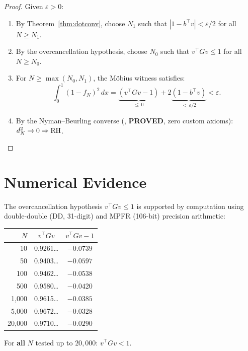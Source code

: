 \documentclass[11pt,a4paper]{article}
\begin{document}
\begin{proof}
Given $\varepsilon > 0$:
\begin{enumerate}
  \item By Theorem~\ref{thm:dotconv}, choose $N_1$ such that
    $|1 - b^\top v| < \varepsilon/2$ for all $N \geq N_1$.
  \item By the overcancellation hypothesis, choose $N_0$ such that
    $v^\top G v \leq 1$ for all $N \geq N_0$.
  \item For $N \geq \max(N_0, N_1)$, the M\"obius witness satisfies:
    \[
      \int_0^1 (1 - f_N)^2\,dx
      = \underbrace{(v^\top G v - 1)}_{\leq\, 0}
        + 2\underbrace{(1 - b^\top v)}_{<\, \varepsilon/2}
      < \varepsilon.
    \]
  \item By the Nyman--Beurling converse
    (, \textbf{PROVED}, zero custom
    axioms): $d_N^2 \to 0 \Rightarrow \mathrm{RH}$.
\end{enumerate}
\end{proof}

\section{Numerical Evidence}
\label{sec:numerics}

The overcancellation hypothesis $v^\top G v \leq 1$ is supported
by computation using double-double (DD, 31-digit) and MPFR
(106-bit) precision arithmetic:

\begin{center}
\begin{tabular}{@{}rcc@{}}
\toprule
$N$ & $v^\top G v$ & $v^\top G v - 1$ \\
\midrule
10    & 0.9261\ldots & $-0.0739$ \\
50    & 0.9403\ldots & $-0.0597$ \\
100   & 0.9462\ldots & $-0.0538$ \\
500   & 0.9580\ldots & $-0.0420$ \\
1{,}000  & 0.9615\ldots & $-0.0385$ \\
5{,}000  & 0.9672\ldots & $-0.0328$ \\
20{,}000 & 0.9710\ldots & $-0.0290$ \\
\bottomrule
\end{tabular}
\end{center}

\noindent
For \textbf{all} $N$ tested up to $20{,}000$: $v^\top G v < 1$.
\end{document}
